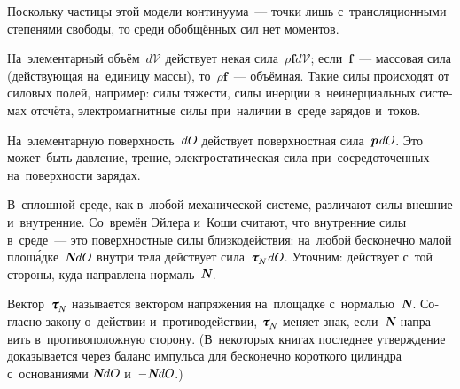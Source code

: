\begin{otherlanguage}{russian}


Поскольку частицы этой модели континуума~--- точки лишь с~трансляционными степенями свободы, то среди обобщённых сил нет моментов.


На~элементарный объём~$d\mathcal{V}$ действует некая сила~${\rho \bm{f} d\mathcal{V}}$; \hbox{если}~$\bm{f}$~--- массовая сила (действующая на~единицу массы), то~${\rho \bm{f}}$~--- объёмная. Такие силы происходят от силовых полей, например: силы тяжести, силы инерции в~неинерциальных системах отсчёта, электромагнитные силы при~наличии в~среде зарядов и~токов.

На~элементарную поверхность~$dO\hspace{-0.12ex}$ действует поверхностная сила~${\bm{p} \hspace{0.2ex} dO\hspace{-0.12ex}}$. Это может~быть давление, трение, электростатическая сила при~сосредоточенных на~поверхности зарядах.

В~сплошной среде, как в~любой механической системе, различают силы внешние и~внутренние. Со~времён Эйлера и~Коши считают, что внутренние силы в~среде~--- это поверхностные силы близкодействия: на~любой бесконечно малой площ\'{а}дке~${\mathboldN dO\hspace{-0.12ex}}$ внутри тела действует сила~${\cauchystress_{\hspace{-0.2ex}\raisemath{-0.1em}{N}\hspace{0.1ex}} dO\hspace{-0.12ex}}$. Уточним: действует с~той стороны, куда направлена нормаль~$\mathboldN$.

Вектор~${\cauchystress_{\hspace{-0.2ex}\raisemath{-0.1em}{N}}\hspace{-0.1ex}}$ называется вектором напряжения на~площадке с~нормалью~$\mathboldN$. Согласно закону о~действии и~противодействии, ${\cauchystress_{\hspace{-0.2ex}\raisemath{-0.1em}{N}}\hspace{-0.1ex}}$ меняет знак, если~$\mathboldN$ направить в~противоположную сторону.
(В~некоторых книгах последнее утверждение доказывается через баланс импульса для бесконечно короткого цилиндра с~основаниями ${\mathboldN dO\hspace{-0.12ex}}$ и~${- \hspace{0.1ex} \mathboldN dO\hspace{-0.12ex}}$.)


\end{otherlanguage}

